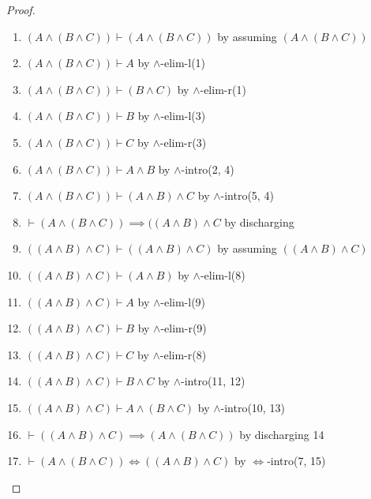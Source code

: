 \begin{proof}
\begin{enumerate}
\item $(A\land(B\land C))\vdash(A\land(B\land C))$ by assuming $(A\land(B\land C))$
\item $(A\land(B\land C))\vdash A$ by $\land$-elim-l(1)%
\item $(A\land(B\land C))\vdash(B\land C)$ by $\land$-elim-r(1)
\item $(A\land(B\land C))\vdash B$ by $\land$-elim-l(3)%
\item $(A\land(B\land C))\vdash C$ by $\land$-elim-r(3)%
\item $(A\land(B\land C))\vdash A\land B$ by $\land$-intro(2, 4)%
\item $(A\land(B\land C))\vdash(A\land B)\land C$ by $\land$-intro(5, 4)%
\item $\vdash(A\land(B\land C))\implies((A\land B)\land C$ by discharging%
\item $((A\land B)\land C)\vdash((A\land B)\land C)$ by assuming $((A\land B)\land C)$%
\item $((A\land B)\land C)\vdash(A\land B)$ by $\land$-elim-l(8)%
\item $((A\land B)\land C)\vdash A$ by $\land$-elim-l(9)%
\item $((A\land B)\land C)\vdash B$ by $\land$-elim-r(9)%
\item $((A\land B)\land C)\vdash C$ by $\land$-elim-r(8)%
\item $((A\land B)\land C)\vdash B\land C$ by $\land$-intro(11, 12)%
\item $((A\land B)\land C)\vdash A\land(B\land C)$ by $\land$-intro(10, 13)%
\item $\vdash((A\land B)\land C)\implies(A\land(B\land C))$ by
  discharging 14%
\item $\vdash(A\land(B\land C))\iff((A\land B)\land C)$ by $\Leftrightarrow$-intro(7, 15)\qedhere
\end{enumerate}
\end{proof}

